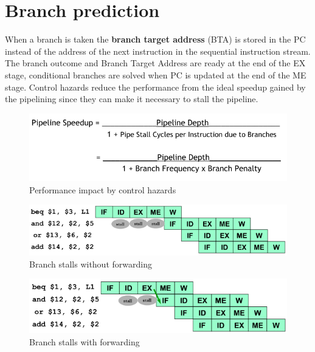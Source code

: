 
\section{Branch prediction}\label{sec:branch-prediction}
When a branch is taken the \textbf{branch target address} (BTA) is stored in the PC instead of the address of the
next instruction in the sequential instruction stream.
The branch outcome and Branch Target Address are ready at the end of the EX stage, conditional branches are solved
when PC is updated at the end of the ME stage.
Control hazards reduce the performance from the ideal speedup gained by the pipelining since they can
make it necessary to stall the pipeline.

\begin{figure}[h]
    \centering
    \includegraphics[scale = 0.4]{images/performace-impact-control-hazards}
    \caption{Performance impact by control hazards}
    \label{fig:performance-impact-by-control-hazards}
\end{figure}


\begin{figure}[h]
    \centering
    \includegraphics[scale = 0.4]{images/branch-without-forwarding}
    \caption{Branch stalls without forwarding}
    \label{fig:branch-stalls-without-forwarding}
\end{figure}

\begin{figure}[h]
    \centering
    \includegraphics[scale = 0.4]{images/branch-with-forwarding}
    \caption{Branch stalls with forwarding}
    \label{fig:branch-stalls-with-forwarding}
\end{figure}

